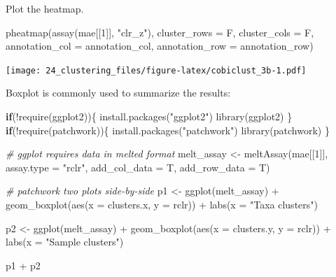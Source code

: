 \documentclass[
]{book}
\newenvironment{Shaded}{\begin{snugshade}}{\end{snugshade}}
\newcommand{\AttributeTok}[1]{\textcolor[rgb]{0.77,0.63,0.00}{#1}}
\newcommand{\CommentTok}[1]{\textcolor[rgb]{0.56,0.35,0.01}{\textit{#1}}}
\newcommand{\ControlFlowTok}[1]{\textcolor[rgb]{0.13,0.29,0.53}{\textbf{#1}}}
\newcommand{\DecValTok}[1]{\textcolor[rgb]{0.00,0.00,0.81}{#1}}
\newcommand{\FunctionTok}[1]{\textcolor[rgb]{0.00,0.00,0.00}{#1}}
\newcommand{\NormalTok}[1]{#1}
\newcommand{\OtherTok}[1]{\textcolor[rgb]{0.56,0.35,0.01}{#1}}
\newcommand{\SpecialCharTok}[1]{\textcolor[rgb]{0.00,0.00,0.00}{#1}}
\newcommand{\StringTok}[1]{\textcolor[rgb]{0.31,0.60,0.02}{#1}}
\begin{document}
Plot the heatmap.

\begin{Shaded}
\begin{Highlighting}[]
\FunctionTok{pheatmap}\NormalTok{(}\FunctionTok{assay}\NormalTok{(mae[[}\DecValTok{1}\NormalTok{]], }\StringTok{"clr\_z"}\NormalTok{), }\AttributeTok{cluster\_rows =}\NormalTok{ F, }\AttributeTok{cluster\_cols =}\NormalTok{ F, }
         \AttributeTok{annotation\_col =}\NormalTok{ annotation\_col,}
         \AttributeTok{annotation\_row =}\NormalTok{ annotation\_row)}
\end{Highlighting}
\end{Shaded}

\texttt{[image: 24\_clustering\_files/figure-latex/cobiclust\_3b-1.pdf]}

Boxplot is commonly used to summarize the results:

\begin{Shaded}
\begin{Highlighting}[]
\ControlFlowTok{if}\NormalTok{(}\SpecialCharTok{!}\FunctionTok{require}\NormalTok{(ggplot2))\{}
    \FunctionTok{install.packages}\NormalTok{(}\StringTok{"ggplot2"}\NormalTok{)}
    \FunctionTok{library}\NormalTok{(ggplot2)}
\NormalTok{\}}
\ControlFlowTok{if}\NormalTok{(}\SpecialCharTok{!}\FunctionTok{require}\NormalTok{(patchwork))\{}
    \FunctionTok{install.packages}\NormalTok{(}\StringTok{"patchwork"}\NormalTok{)}
    \FunctionTok{library}\NormalTok{(patchwork)}
\NormalTok{\}}

\CommentTok{\# ggplot requires data in melted format}
\NormalTok{melt\_assay }\OtherTok{\textless{}{-}} \FunctionTok{meltAssay}\NormalTok{(mae[[}\DecValTok{1}\NormalTok{]], }\AttributeTok{assay.type =} \StringTok{"rclr"}\NormalTok{, }\AttributeTok{add\_col\_data =}\NormalTok{ T, }\AttributeTok{add\_row\_data =}\NormalTok{ T)}

\CommentTok{\# patchwork two plots side{-}by{-}side}
\NormalTok{p1 }\OtherTok{\textless{}{-}} \FunctionTok{ggplot}\NormalTok{(melt\_assay) }\SpecialCharTok{+}
  \FunctionTok{geom\_boxplot}\NormalTok{(}\FunctionTok{aes}\NormalTok{(}\AttributeTok{x =}\NormalTok{ clusters.x, }\AttributeTok{y =}\NormalTok{ rclr)) }\SpecialCharTok{+}
  \FunctionTok{labs}\NormalTok{(}\AttributeTok{x =} \StringTok{"Taxa clusters"}\NormalTok{)}

\NormalTok{p2 }\OtherTok{\textless{}{-}} \FunctionTok{ggplot}\NormalTok{(melt\_assay) }\SpecialCharTok{+}
  \FunctionTok{geom\_boxplot}\NormalTok{(}\FunctionTok{aes}\NormalTok{(}\AttributeTok{x =}\NormalTok{ clusters.y, }\AttributeTok{y =}\NormalTok{ rclr)) }\SpecialCharTok{+}
  \FunctionTok{labs}\NormalTok{(}\AttributeTok{x =} \StringTok{"Sample clusters"}\NormalTok{)}

\NormalTok{p1 }\SpecialCharTok{+}\NormalTok{ p2}
\end{Highlighting}
\end{Shaded}
\end{document}
